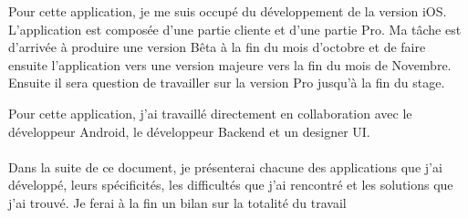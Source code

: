 Pour cette application, je me suis occupé du développement de la version \gls{iOS}. L'application est composée d'une partie cliente et d'une partie Pro. Ma tâche est d'arrivée à produire une version Bêta à la fin du mois d'octobre et de faire ensuite l'application vers une version majeure vers la fin du mois de Novembre. Ensuite il sera question de travailler sur la version Pro jusqu'à la fin du stage.

Pour cette application, j'ai travaillé directement en collaboration avec le développeur \gls{Android}, le développeur Backend et un designer \gls{UI}.
\paragraph*{}
Dans la suite de ce document, je présenterai chacune des applications que j'ai développé, leurs spécificités, les difficultés que j'ai rencontré et les solutions que j'ai trouvé. Je ferai à la fin un bilan sur la totalité du travail 